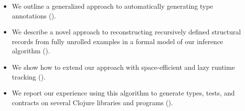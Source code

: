 
%
%
%



\begin{itemize}
\item We outline a generalized approach to automatically
  generating type annotations ().
\item
  We describe a novel approach to reconstructing recursively
  defined structural records from fully unrolled examples
  in a formal model of our inference algorithm ().
\item
  We show how to extend our approach with space-efficient and lazy
  runtime tracking ().
\item
  We report our experience using this algorithm to generate
  types, tests, and contracts on several
  Clojure libraries and programs ().
\end{itemize}
